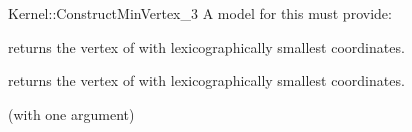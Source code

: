 \begin{ccRefFunctionObjectConcept}{Kernel::ConstructMinVertex_3}
A model for this must provide:


 {returns the vertex of
   with lexicographically smallest coordinates.}

 {returns the vertex of
   with lexicographically smallest coordinates.}

\ccRefines
{} (with one argument)

\ccSeeAlso
{}\\

\end{ccRefFunctionObjectConcept}
